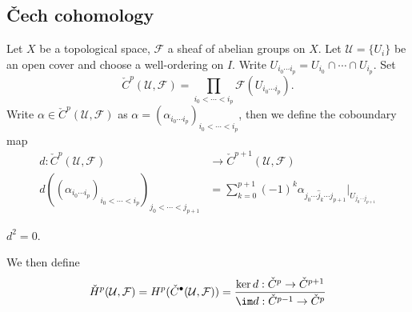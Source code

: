 \documentclass[a4paper]{article}
\newcommand{\sh}[1]{\mathcal{#1}} %
\begin{document}
\subsection{Čech cohomology}

Let \(X\) be a topological space, \(\sh F\) a sheaf of abelian groups on \(X\). Let \(\mathcal U = \{U_i\}\) be an open cover and choose a well-ordering on \(I\). Write \(U_{i_0 \cdots i_p} = U_{i_0} \cap \cdots \cap U_{i_p}\). Set
\[
  \check C^p(\mathcal U, \sh F) = \prod_{i_0 < \cdots < i_p} \sh F(U_{i_0 \cdots i_p}).
\]
Write \(\alpha \in \check C^p(\mathcal U, \sh F)\) as \(\alpha = (\alpha_{i_0 \cdots i_p})_{i_0 < \cdots < i_p}\), then we define the coboundary map
\begin{align*}
  d: \check C^p(\mathcal U, \sh F) &\to \check C^{p + 1}(\mathcal U, \sh F) \\
  d((\alpha_{i_0 \cdots i_p})_{i_0 < \cdots < i_p})_{j_0 < \cdots < j_{p + 1}} &= \sum_{k = 0}^{p + 1} (-1)^k \alpha_{j_0 \cdots \hat j_k \cdots j_{p + 1}}|_{U_{j_0 \cdots j_{p + 1}}}
\end{align*}

\begin{ex}
  \(d^2 = 0\).
\end{ex}
We then define
\[
  \check H^p(\mathcal U, \sh F) = H^p(\check C^\bullet(\mathcal U, \sh F)) = \frac{\ker d: \check C^p \to \check C^{p + 1}}{\im d: \check C^{p - 1} \to \check C^p}
\]
\end{document}
